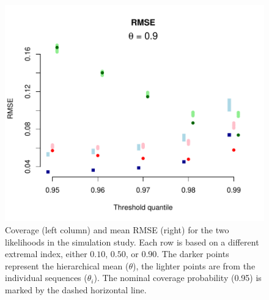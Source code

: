 \begin{figure}[H]
\begin{center}
\includegraphics[scale=0.48]{../extremal_comparison/figs/sim_rmse_90.pdf}
\end{center}
\caption{Coverage (left column) and mean RMSE (right) for the two likelihoods in the simulation study. Each row is based on a different extremal index, either $0.10$, $0.50$, or $0.90$. The darker points represent the hierarchical mean ($\theta$), the lighter points are from the individual sequences ($\theta_i$). The nominal coverage probability (0.95) is marked by the dashed horizontal line.}
\label{figsim}
\end{figure}
